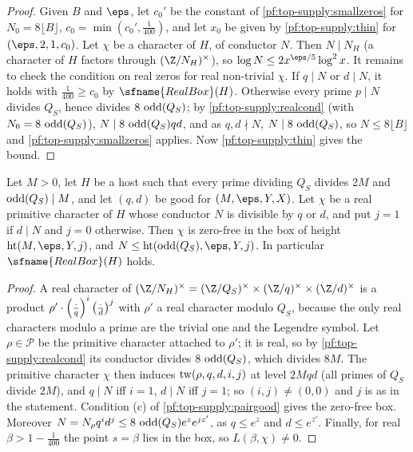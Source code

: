 \begin{proof}
Given $B$ and $\eps$, let $c_0'$ be the constant of \cref{pf:top-supply:smallzeros} for $N_0=8\lfloor B\rfloor$,
$c_0=\min(c_0',\frac1{400})$, and let $x_0$ be given by \cref{pf:top-supply:thin} for $(\eps,2,1,c_0)$. Let $\chi$ be a
character of $H$, of conductor $N$. Then $N\mid N_H$ (a character of $H$ factors through $(\Z/N_H)^\times$), so
$\log N\le2x^{\eps/5}\log^2x$. It remains to check the condition on real zeros for real non-trivial $\chi$. If $q\mid N$ or
$d\mid N$, it holds with $\frac1{400}\ge c_0$ by $\sfname{RealBox}(H)$. Otherwise every prime $p\mid N$ divides
$Q_S$, hence divides $8\,\operatorname{odd}(Q_S)$; by \cref{pf:top-supply:realcond} (with $N_0=8\,\operatorname{odd}(Q_S)$),
$N\mid8\,\operatorname{odd}(Q_S)qd$, and as $q,d\nmid N$, $N\mid8\,\operatorname{odd}(Q_S)$, so $N\le8\lfloor B\rfloor$ and
\cref{pf:top-supply:smallzeros} applies. Now \cref{pf:top-supply:thin} gives the bound.
\end{proof}

\begin{lemma}\label{pf:top-supply:realbox}
Let $M>0$, let $H$ be a host such that every prime dividing $Q_S$ divides $2M$ and $\operatorname{odd}(Q_S)\mid M$, and let
$(q,d)$ be good for $(M,\eps,Y,X)$. Let $\chi$ be a real primitive character of $H$ whose conductor $N$ is divisible by
$q$ or $d$, and put $j=1$ if $d\mid N$ and $j=0$ otherwise. Then $\chi$ is zero-free in the box of height
$\topsupplyht(M,\eps,Y,j)$, and $N\le\topsupplyht(\topsupplyodd(Q_S),\eps,Y,j)$. In particular $\sfname{RealBox}(H)$ holds.
 
\end{lemma}

\begin{proof}
A real character of $(\Z/N_H)^\times=(\Z/Q_S)^\times\times(\Z/q)^\times\times(\Z/d)^\times$ is a product
$\rho'\cdot\left(\frac{\cdot}{q}\right)^i\left(\frac{\cdot}{d}\right)^j$ with $\rho'$ a real character modulo $Q_S$, because the only real
characters modulo a prime are the trivial one and the Legendre symbol. Let $\rho\in\mathcal P$ be the primitive character
attached to $\rho'$; it is real, so by \cref{pf:top-supply:realcond} its conductor divides $8\,\operatorname{odd}(Q_S)$, which
divides $8M$. The primitive character $\chi$ then induces $\operatorname{tw}(\rho,q,d,i,j)$ at level $2Mqd$ (all primes of $Q_S$
divide $2M$), and $q\mid N$ iff $i=1$, $d\mid N$ iff $j=1$; so $(i,j)\ne(0,0)$ and $j$ is as in the statement.
Condition (c) of \cref{pf:top-supply:pairgood} gives the zero-free box. Moreover $N=N_\rho q^id^j\le
8\,\operatorname{odd}(Q_S)e^ze^{jz'}$, as $q\le e^z$ and $d\le e^{z'}$. Finally, for real $\beta>1-\frac1{400}$ the point $s=\beta$
lies in the box, so $L(\beta,\chi)\ne0$.
\end{proof}

